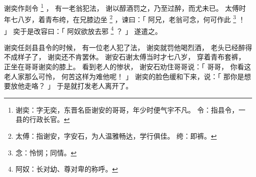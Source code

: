 
\switchcolumn*[\section{}]

谢奕作剡令%
\footnote{%
    谢奕：字无奕，东晋名臣谢安的哥哥，年少时便气宇不凡。
    令：指县令，一县的行政长官。
}%
，
有一老翁犯法，
谢以醇酒罚之，乃至过醉，而尤未已。
太傅时年七八岁，着青布绔，在兄膝边坐%
\footnote{%
    太傅：指谢安，字安石，为人温雅畅达，学行俱佳。
    绔：即裤。
}%
，谏曰：「
    阿兄，老翁可念，何可作此%
    \footnote{%
        念：怜悯；同情。
    }%
    ！
」
奕于是改容曰：「
    阿奴欲放去邪%
    \footnote{%
        阿奴：长对幼、尊对卑的称呼。
    }%
    ？
」
遂遣之。

\switchcolumn

谢奕任剡县县令的时候，
有一位老人犯了法，
谢奕就罚他喝烈酒，
老头已经醉得不成样子了，
谢奕还不肯罢休。
谢安石谢太傅当时才七八岁，
穿着青布套裤，
正坐在哥哥谢奕的膝上。
看到老人的惨状，
谢安石劝住哥哥说：「
    哥哥，
    你看这老人家那么可怜，
    何苦这样为难他呢！
」
谢奕的脸色缓和下来，说：「
    那你是想要放他走咯？
」
于是就打发老人离开了。

